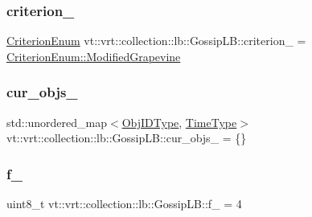 \subsubsection{\texorpdfstring{criterion\+\_\+}{criterion\_}}
{\footnotesize\ttfamily \hyperlink{namespacevt_1_1vrt_1_1collection_1_1lb_a4e454750e102cf5404d5ac151148951c}{Criterion\+Enum} vt\+::vrt\+::collection\+::lb\+::\+Gossip\+L\+B\+::criterion\+\_\+ = \hyperlink{namespacevt_1_1vrt_1_1collection_1_1lb_a4e454750e102cf5404d5ac151148951caf2d66de88187d7c4c75884f5605ae168}{Criterion\+Enum\+::\+Modified\+Grapevine}\hspace{0.3cm}{\ttfamily [private]}}

\mbox{\label{structvt_1_1vrt_1_1collection_1_1lb_1_1_gossip_l_b_a77224514e754349db1c297050ec69343}} 
\subsubsection{\texorpdfstring{cur\+\_\+objs\+\_\+}{cur\_objs\_}}
{\footnotesize\ttfamily std\+::unordered\+\_\+map$<$\hyperlink{structvt_1_1vrt_1_1collection_1_1lb_1_1_base_l_b_a15a2f756b59c8c2437985206b32aa403}{Obj\+I\+D\+Type}, \hyperlink{namespacevt_a876a9d0cd5a952859c72de8a46881442}{Time\+Type}$>$ vt\+::vrt\+::collection\+::lb\+::\+Gossip\+L\+B\+::cur\+\_\+objs\+\_\+ = \{\}\hspace{0.3cm}{\ttfamily [private]}}

\mbox{\label{structvt_1_1vrt_1_1collection_1_1lb_1_1_gossip_l_b_a8e583b068a5241bf1960866c731e40d8}} 
\subsubsection{\texorpdfstring{f\+\_\+}{f\_}}
{\footnotesize\ttfamily uint8\+\_\+t vt\+::vrt\+::collection\+::lb\+::\+Gossip\+L\+B\+::f\+\_\+ = 4\hspace{0.3cm}{\ttfamily [private]}}

